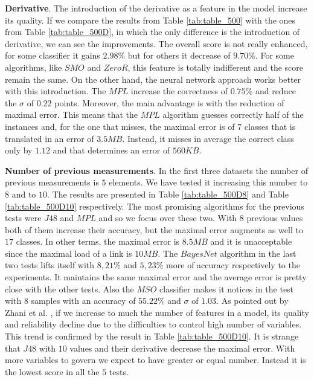 \documentclass[12pt]{article}
\begin{document}
\textbf{Derivative}.
The introduction of the derivative as a feature in the model increase its quality.
If we compare the results from Table \ref{tab:table_500} with the ones from Table \ref{tab:table_500D}, in which the only difference is the introduction of derivative, we can see the improvements.
The overall score is not really enhanced, for some classifier it gains $2.98\%$ but for others it decrease of $9.70\%$.
For some algorithms, like $SMO$ and $ZeroR$, this feature is totally indifferent and the score remain the same.
On the other hand, the neural network approach works better with this introduction. The $MPL$ increase the correctness of $0.75\%$ and reduce the $\sigma$ of $0.22$ points. 
Moreover, the main advantage is with the reduction of maximal error. 
This means that the $MPL$ algorithm guesses correctly half of the instances and, for the one that misses, the maximal error is of $7$ classes that is translated in an error of $3.5MB$. 
Instead, it misses in average the correct class only by $1.12$ and that determines an error of $560KB$.


\textbf{Number of previous measurements}.
In the first three datasets the number of previous measurements is $5$ elements. 
We have tested it increasing this number to $8$ and to $10$. 
The results are presented in Table \ref{tab:table_500D8} and Table \ref{tab:table_500D10} respectively.
The most promising algorithms for the previous tests were $J48$ and $MPL$ and so we focus over these two.
With $8$ previous values both of them increase their accuracy, but the maximal error augments as well to $17$ classes. 
In other terms, the maximal error is $8.5MB$ and it is unacceptable since the maximal load of a link is $10MB$.
The $BayesNet$ algorithm in the last two tests lifts itself with $8,21\%$ and $5,23\%$ more of accuracy respectively to the experiments.
It maintains the same maximal error and the average error is pretty close with the other tests.
Also the $MSO$ classifier makes it notices in the test with $8$ samples with an accuracy of $55.22\%$ and $\sigma$ of $1.03$.
As pointed out by Zhani et al. \cite{zha}, if we increase to much the number of features in a model, its quality and reliability decline due to the difficulties to control high number of variables.
This trend is confirmed by the result in Table \ref{tab:table_500D10}.
\newpage
It is strange that $J48$ with $10$ values and their derivative decrease the maximal error. 
With more variables to govern we expect to have greater or equal number.
Instead it is the lowest score in all the $5$ tests.
\end{document}
